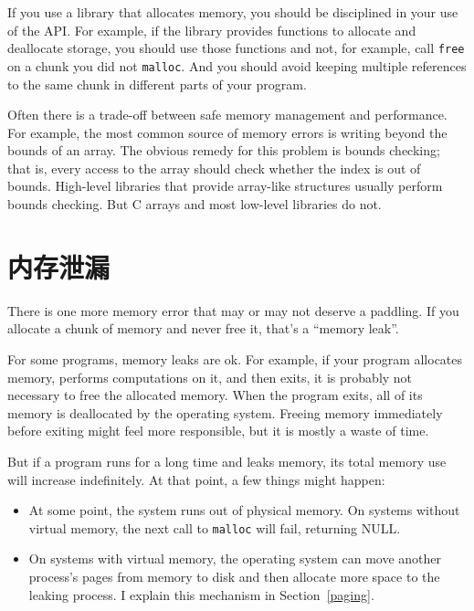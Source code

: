 \documentclass[12pt]{book}
\begin{document}
{If you use a library that allocates memory, you should be disciplined
in your use of the API.  For example, if the library provides
functions to allocate and deallocate storage, you should use those
functions and not, for example, call {\tt free} on a chunk you did not
{\tt malloc}.  And you should avoid keeping multiple references to the
same chunk in different parts of your program.

Often there is a trade-off between safe memory management and performance.
For example, the most common source of memory errors is writing 
beyond the bounds of an array.  The obvious remedy for this problem
is bounds checking; that is, every access to the array should check
whether the index is out of bounds.  High-level libraries that provide
array-like structures usually perform bounds checking.  But C arrays
and most low-level libraries do not.


\section{内存泄漏}
\label{leak}

There is one more memory error that may or may not deserve a paddling.
If you allocate a chunk of memory and never free it, that's a ``memory
leak''.

For some programs, memory leaks are ok.  For example, if your program
allocates memory, performs computations on it, and then exits, it is
probably not necessary to free the allocated memory.  When the program
exits, all of its memory is deallocated by the operating system.
Freeing memory immediately before exiting might feel more responsible,
but it is mostly a waste of time.

But if a program runs for a long time and leaks memory, its total
memory use will increase indefinitely.  At that point, a few things
might happen:

\begin{itemize}

\item At some point, the system runs out of physical memory.  On
  systems without virtual memory, the next call to {\tt malloc} will
  fail, returning NULL.

\item On systems with virtual memory, the operating system can move
  another process's pages from memory to disk and then allocate
  more space to the leaking process.  I explain this mechanism
  in Section~\ref{paging}.


\end{itemize}}
\end{document}
